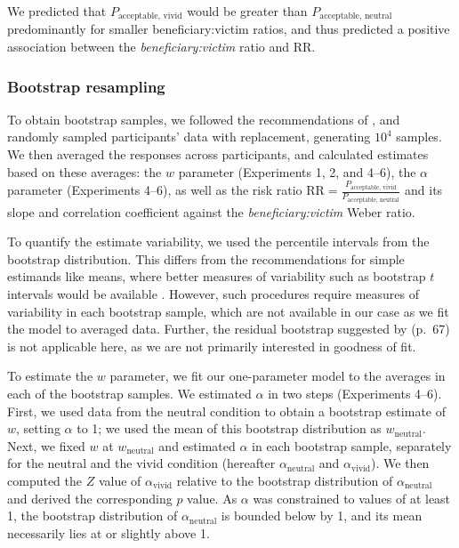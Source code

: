 \documentclass[
]{article}
\begin{document}
We predicted that \(P_{\text{acceptable, vivid}}\) would be greater than \(P_{\text{acceptable, neutral}}\) predominantly for smaller beneficiary:victim ratios, and thus predicted a positive association between the \emph{beneficiary:victim} ratio and \(\mathrm{RR}\).

\subsubsection{Bootstrap resampling}\label{bootstrap-resampling}

To obtain bootstrap samples, we followed the recommendations of \autocite{Hesterberg2015}, and randomly sampled participants' data with replacement, generating \ensuremath{10^{4}} samples. We then averaged the responses across participants, and calculated estimates based on these averages: the \(w\) parameter (Experiments 1, 2, and 4--6), the \(\alpha\) parameter (Experiments 4--6), as well as the risk ratio \(\mathrm{RR}= \frac{P_{\text{acceptable, vivid}}}{P_{\text{acceptable, neutral}}}\) and its slope and correlation coefficient against the \emph{beneficiary:victim} Weber ratio.

To quantify the estimate variability, we used the percentile intervals from the bootstrap distribution. This differs from the recommendations for simple estimands like means, where better measures of variability such as bootstrap \(t\) intervals would be available \autocite{Hesterberg2015}. However, such procedures require measures of variability in each bootstrap sample, which are not available in our case as we fit the model to averaged data. Further, the residual bootstrap suggested by \autocite{Hesterberg2015} (p.~67) is not applicable here, as we are not primarily interested in goodness of fit.

To estimate the \(w\) parameter, we fit our one-parameter model to the averages in each of the bootstrap samples. We estimated \(\alpha\) in two steps (Experiments 4--6). First, we used data from the neutral condition to obtain a bootstrap estimate of \(w\), setting \(\alpha\) to 1; we used the mean of this bootstrap distribution as \(w_\text{neutral}\). Next, we fixed \(w\) at \(w_\text{neutral}\) and estimated \(\alpha\) in each bootstrap sample, separately for the neutral and the vivid condition (hereafter \(\alpha_\text{neutral}\) and \(\alpha_\text{vivid}\)). We then computed the \(Z\) value of \(\alpha_\text{vivid}\) relative to the bootstrap distribution of \(\alpha_\text{neutral}\) and derived the corresponding \(p\) value. As \(\alpha\) was constrained to values of at least 1, the bootstrap distribution of \(\alpha_\text{neutral}\) is bounded below by 1, and its mean necessarily lies at or slightly above 1.
\end{document}
